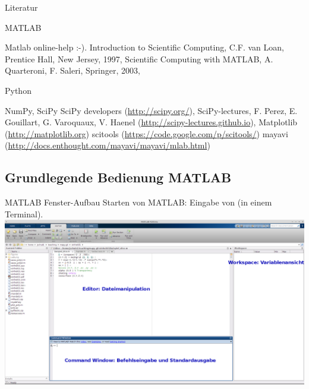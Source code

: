 \documentclass[hyperref={xetex}]{beamer}
\begin{document}
\begin{frame}[fragile]{Literatur}
  \begin{block}{MATLAB}
  \begin{thebibliography}{10}
\small
{} \alert{Matlab online-help :-)}.
 \alert{Introduction to Scientific Computing}, C.F. van Loan, Prentice Hall,
New Jersey, 1997,
 \alert{Scientific Computing with MATLAB}, A. Quarteroni, F. Saleri, Springer, 2003,
\end{thebibliography}
\end{block}
\begin{block}{Python}
  \begin{thebibliography}{10}
      \small
     \alert{NumPy, SciPy} SciPy developers (\url{http://scipy.org/}),
     \alert{SciPy-lectures}, F. Perez, E. Gouillart, G. Varoquaux, V. Haenel (\url{http://scipy-lectures.github.io}),
     \alert{Matplotlib} (\url{http://matplotlib.org})
     \alert{scitools} (\url{https://code.google.com/p/scitools/}) 
     \alert{mayavi} (\url{http://docs.enthought.com/mayavi/mayavi/mlab.html})
  \end{thebibliography}
\end{block}
\end{frame}


\subsection{Grundlegende Bedienung MATLAB}
\begin{frame}[fragile]{MATLAB Fenster-Aufbau}
Starten von MATLAB: Eingabe von  (in einem Terminal).
\centering\includegraphics[width=1\textwidth]{figures/Screenshot-MATLAB}

\end{frame}
\end{document}
